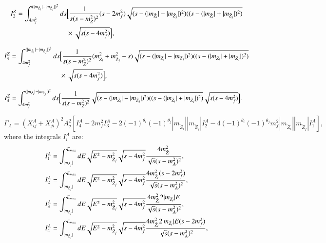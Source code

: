 \documentclass[final,3p,times]{elsarticle}
\begin{document}
\begin{equation}
\begin{aligned}
I_{2}^Z = \int_{4m_{f}^2}^{(|m_{\tilde{Z}_i}| - |m_{\tilde{Z}_j}|)^2} ds & \Big[{1 \over s (s-m_{Z}^2)^2}(s-2 m_{f}^2) \sqrt{(s-(|m_{\tilde{Z}_i}|-|m_{\tilde{Z}_j}|)^2)((s-(|m_{\tilde{Z}_i}|+|m_{\tilde{Z}_j}|)^2)} \\ & \times \sqrt{s(s-4m_{f}^2)}\Big],
\end{aligned}
\end{equation}

\begin{equation}
\begin{aligned}
I_{3}^Z = \int_{4m_{f}^2}^{(|m_{\tilde{Z}_i}| - |m_{\tilde{Z}_j}|)^2} ds & \Big[{1 \over s (s-m_{Z}^2)^2}(m_{\tilde{Z}_i}^2 + m_{\tilde{Z}_j}^2 - s) \sqrt{(s-(|m_{\tilde{Z}_i}|-|m_{\tilde{Z}_j}|)^2)((s-(|m_{\tilde{Z}_i}|+|m_{\tilde{Z}_j}|)^2)} \\ & \times \sqrt{s(s-4m_{f}^2)}\Big],
\end{aligned}
\end{equation}

\begin{equation}
\begin{aligned}
I_{4}^Z = \int_{4m_{f}^2}^{(|m_{\tilde{Z}_i}| - |m_{\tilde{Z}_j}|)^2} ds & \Big[{1 \over s (s-m_{Z}^2)^2}\sqrt{(s-(|m_{\tilde{Z}_i}|-|m_{\tilde{Z}_j}|)^2)((s-(|m_{\tilde{Z}_i}|+|m_{\tilde{Z}_j}|)^2)}\sqrt{s(s-4m_{f}^2)}\Big].
\end{aligned}
\end{equation}

\begin{equation}
\Gamma_A = (X_{ij}^A + X_{ji}^A)^2 A_{q}^2 \left[I_{4}^A + 2m_{f}^2 I_{3}^A - 2(-1)^{\theta_i}(-1)^{\theta_j}|m_{\tilde{Z}_i}||m_{\tilde{Z}_j}|I_{2}^A - 4(-1)^{\theta_i}(-1)^{\theta_j}m_{f}^2|m_{\tilde{Z}_i}||m_{\tilde{Z}_j}|I_{1}^A \right],
\end{equation}
where the integrals $I_{i}^A$ are:
\begin{align}
I_{1}^A &= \int_{|m_{\tilde{Z}_j}|}^{E_{max}} dE \sqrt{E^2 - m_{\tilde{Z}_j}^2} \sqrt{s - 4m_{f}^2} {4 m_{\tilde{Z}_i}^2 \over \sqrt{s}(s-m_{A}^2)^2}, \\
I_{2}^A &= \int_{|m_{\tilde{Z}_j}|}^{E_{max}} dE \sqrt{E^2 - m_{\tilde{Z}_j}^2} \sqrt{s - 4m_{f}^2} {4 m_{\tilde{Z}_i}^2 (s-2m_{f}^2) \over \sqrt{s}(s-m_{A}^2)^2}, \\
I_{3}^A &= \int_{|m_{\tilde{Z}_j}|}^{E_{max}} dE \sqrt{E^2 - m_{\tilde{Z}_j}^2} \sqrt{s - 4m_{f}^2} {4 m_{\tilde{Z}_i}^2 2|m_{\tilde{Z}_i}|E \over \sqrt{s}(s-m_{A}^2)^2}, \\
I_{4}^A &= \int_{|m_{\tilde{Z}_j}|}^{E_{max}} dE \sqrt{E^2 - m_{\tilde{Z}_j}^2} \sqrt{s - 4m_{f}^2} {4 m_{\tilde{Z}_i}^2 2|m_{\tilde{Z}_i}|E (s-2m_{f}^2) \over \sqrt{s}(s-m_{A}^2)^2},
\end{align}
\end{document}
